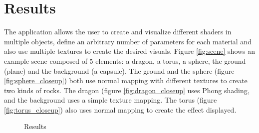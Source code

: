 \section{Results}
The application allows the user to create and visualize different shaders in multiple objects, define an arbitrary number of parameters for each material and also use multiple textures to create the desired visuals. Figure \ref{fig:scene} shows an example scene composed of 5 elements: a dragon, a torus, a sphere, the ground (plane) and the background (a capsule). The ground and the sphere (figure \ref{fig:sphere_closeup}) both use normal mapping with different textures to create two kinds of rocks. The dragon (figure \ref{fig:dragon_closeup} uses Phong shading, and the background uses a simple texture mapping. The torus (figure \ref{fig:torus_closeup}) also uses normal mapping to create the effect displayed.

\begin{figure}
    \centering
    \hfil
    \hfil
    \hfil
    \caption{Results}
\end{figure}

